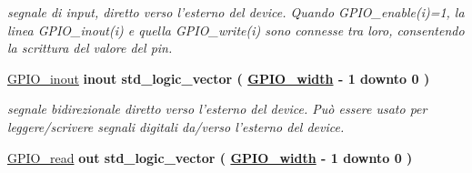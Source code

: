 \begin{DoxyCompactItemize}
\begin{DoxyCompactList}\small\item\em segnale di input, diretto verso l'esterno del device. Quando G\+P\+I\+O\+\_\+enable(i)=1, la linea G\+P\+I\+O\+\_\+inout(i) e quella G\+P\+I\+O\+\_\+write(i) sono connesse tra loro, consentendo la scrittura del valore del pin. \end{DoxyCompactList}\item 
\hypertarget{group___g_p_i_o-array_ga8829699d739ef35a4c5da396ffd38387}{\hyperlink{group___g_p_i_o-array_ga8829699d739ef35a4c5da396ffd38387}{G\+P\+I\+O\+\_\+inout}  {\bfseries {\bfseries \textcolor{vhdlchar}{inout}\textcolor{vhdlchar}{ }}} {\bfseries \textcolor{vhdlchar}{std\+\_\+logic\+\_\+vector}\textcolor{vhdlchar}{ }\textcolor{vhdlchar}{(}\textcolor{vhdlchar}{ }\textcolor{vhdlchar}{ }\textcolor{vhdlchar}{ }\textcolor{vhdlchar}{ }{\bfseries \hyperlink{group___g_p_i_o-array_ga0b52ca75e9a6093b2b60d5e851803069}{G\+P\+I\+O\+\_\+width}} \textcolor{vhdlchar}{-\/}\textcolor{vhdlchar}{ } \textcolor{vhdldigit}{1} \textcolor{vhdlchar}{ }\textcolor{vhdlchar}{downto}\textcolor{vhdlchar}{ }\textcolor{vhdlchar}{ } \textcolor{vhdldigit}{0} \textcolor{vhdlchar}{ }\textcolor{vhdlchar}{)}\textcolor{vhdlchar}{ }} }\label{group___g_p_i_o-array_ga8829699d739ef35a4c5da396ffd38387}

\begin{DoxyCompactList}\small\item\em segnale bidirezionale diretto verso l'esterno del device. Può essere usato per leggere/scrivere segnali digitali da/verso l'esterno del device. \end{DoxyCompactList}\item 
\hypertarget{group___g_p_i_o-array_gafbe6792efd02cef42af7717592c1b04a}{\hyperlink{group___g_p_i_o-array_gafbe6792efd02cef42af7717592c1b04a}{G\+P\+I\+O\+\_\+read}  {\bfseries {\bfseries \textcolor{vhdlchar}{out}\textcolor{vhdlchar}{ }}} {\bfseries \textcolor{vhdlchar}{std\+\_\+logic\+\_\+vector}\textcolor{vhdlchar}{ }\textcolor{vhdlchar}{(}\textcolor{vhdlchar}{ }\textcolor{vhdlchar}{ }\textcolor{vhdlchar}{ }\textcolor{vhdlchar}{ }{\bfseries \hyperlink{group___g_p_i_o-array_ga0b52ca75e9a6093b2b60d5e851803069}{G\+P\+I\+O\+\_\+width}} \textcolor{vhdlchar}{-\/}\textcolor{vhdlchar}{ } \textcolor{vhdldigit}{1} \textcolor{vhdlchar}{ }\textcolor{vhdlchar}{downto}\textcolor{vhdlchar}{ }\textcolor{vhdlchar}{ } \textcolor{vhdldigit}{0} \textcolor{vhdlchar}{ }\textcolor{vhdlchar}{)}\textcolor{vhdlchar}{ }} }\label{group___g_p_i_o-array_gafbe6792efd02cef42af7717592c1b04a}


\end{DoxyCompactItemize}
